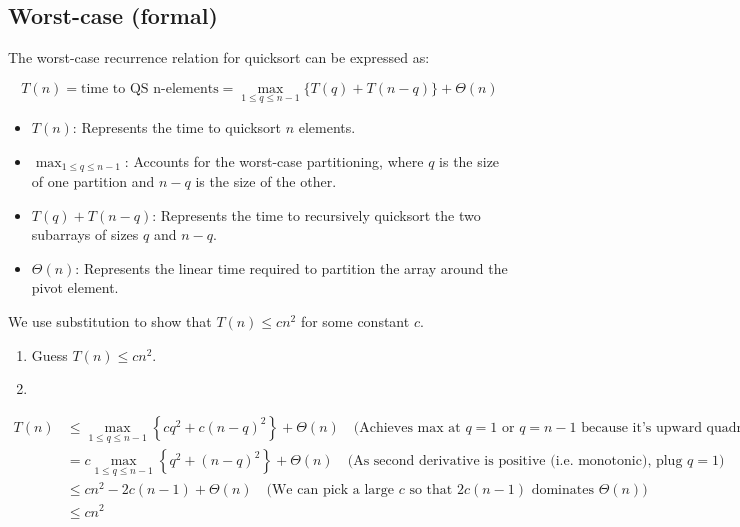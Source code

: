 \subsection{Worst-case (formal)}
    \begin{derivation}
        The worst-case recurrence relation for quicksort can be expressed as:

        \[
        T(n) = \text{time to QS n-elements} = \max_{1 \leq q \leq n-1} \{ T(q) + T(n-q) \} + \Theta(n)
        \]

        \begin{center}
        \end{center}
        
        \begin{itemize}
            \item $T(n)$: Represents the time to quicksort $n$ elements.
            \item $\max_{1 \leq q \leq n-1}$: Accounts for the worst-case partitioning, where $q$ is the size of one partition and $n-q$ is the size of the other.
            \item $T(q) + T(n - q)$: Represents the time to recursively quicksort the two subarrays of sizes $q$ and $n-q$.
            \item $\Theta(n)$: Represents the linear time required to partition the array around the pivot element.
        \end{itemize}
        \vspace{1em}

        \noindent We use substitution to show that \( T(n) \leq cn^2 \) for some constant \( c \).
        \begin{enumerate}
            \item Guess \( T(n) \leq cn^2 \).
            \item 
        \end{enumerate}
        \begin{align*}
            T(n) &\leq \max_{1 \leq q \leq n-1} \left\{ cq^2 + c(n-q)^2 \right\} + \Theta(n) \quad \text{(Achieves max at } q = 1 \text{ or } q = n-1 \text{ because it's upward quadratic)} \\
                 &= c \max_{1 \leq q \leq n-1} \left\{ q^2 + (n-q)^2 \right\} + \Theta(n) \quad \text{(As second derivative is positive (i.e. monotonic), plug } q = 1 \text{)} \\
                 &\leq cn^2 - 2c(n-1) + \Theta(n) \quad \text{(We can pick a large } c \text{ so that } 2c(n-1) \text{ dominates } \Theta(n)) \\
                 &\leq cn^2
        \end{align*}


\end{derivation}
